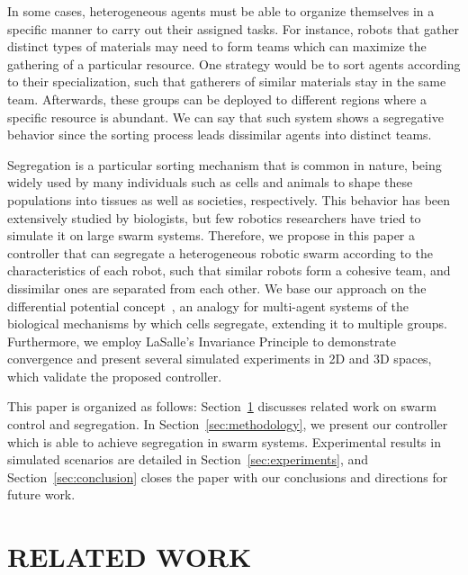 \documentclass[letterpaper, 10 pt, conference]{ieeeconf}  %
\begin{document}
In some cases, heterogeneous agents must be able to organize
themselves in a specific manner to carry out their assigned tasks. For
instance, robots that gather distinct types of materials may need to
form teams which can maximize the gathering of a particular
resource. One strategy would be to sort agents according to their
specialization, such that gatherers of similar materials stay in the
same team. Afterwards, these groups can be deployed to different
regions where a specific resource is abundant. We can say that such
system shows a segregative behavior since the sorting process leads
dissimilar agents into distinct teams.

Segregation is a particular sorting mechanism that is common in
nature, being widely used by many individuals such as cells and
animals to shape these populations into tissues as well as societies,
respectively. This behavior has been extensively studied by
biologists, but few robotics researchers have tried to simulate it on
large swarm systems. Therefore, we propose in this paper a controller
that can segregate a heterogeneous robotic swarm according to the
characteristics of each robot, such that similar robots form a
cohesive team, and dissimilar ones are separated from each other. We
base our approach on the differential potential
concept~\cite{Kumar:10}, an analogy for multi-agent systems of the
biological mechanisms by which cells segregate, extending it to
multiple groups. Furthermore, we employ LaSalle's Invariance Principle
to demonstrate convergence and present several simulated experiments
in 2D and 3D spaces, which validate the proposed controller.

This paper is organized as follows: Section~\ref{sec:related_work}
discusses related work on swarm control and segregation. In
Section~\ref{sec:methodology}, we present our controller which is able
to achieve segregation in swarm systems. Experimental results in
simulated scenarios are detailed in Section~\ref{sec:experiments}, and
Section~\ref{sec:conclusion} closes the paper with our conclusions and
directions for future work.
\section{RELATED WORK}
\label{sec:related_work}
\end{document}
